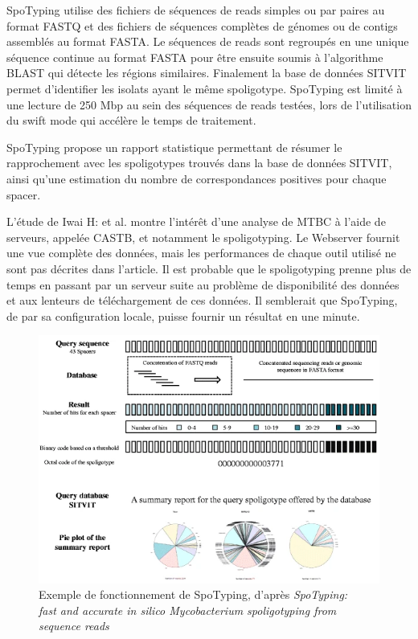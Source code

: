 \documentclass[twoside,a4paper,11pt,frenchb,openany]{report}
\begin{document}
SpoTyping utilise des fichiers de séquences de reads simples ou par paires au format FASTQ et des fichiers de séquences complètes de génomes ou de contigs assemblés au format FASTA. Le séquences de reads sont regroupés en une unique séquence continue au format FASTA pour être ensuite soumis à l'algorithme BLAST qui détecte les régions similaires. Finalement la base de données SITVIT permet d'identifier les isolats ayant le même spoligotype. SpoTyping est limité à une lecture de 250 Mbp au sein des séquences de reads testées, lors de l'utilisation du swift mode qui accélère le temps de traitement.

SpoTyping propose un rapport statistique permettant de résumer le rapprochement avec les spoligotypes trouvés dans la base de données SITVIT, ainsi qu'une estimation du nombre de correspondances positives pour chaque spacer.

L'étude de Iwai H: et al. \cite{iwai} montre l'intérêt d'une analyse de MTBC à l'aide de serveurs, appelée CASTB, et notamment le spoligotyping. Le Webserver fournit une vue complète des données, mais les performances de chaque outil utilisé ne sont pas décrites dans l'article. Il est probable que le spoligotyping prenne plus de temps en passant par un serveur suite au problème de disponibilité des données et aux lenteurs de téléchargement de ces données. Il semblerait que SpoTyping, de par sa configuration locale, puisse fournir un résultat en une minute.

\begin{figure}
\includegraphics[scale=0.6]{spotyping.png}
\caption{Exemple de fonctionnement de SpoTyping, d'après \textit{SpoTyping:\\ fast and accurate in silico Mycobacterium spoligotyping from sequence reads}}
\end{figure}
\end{document}
